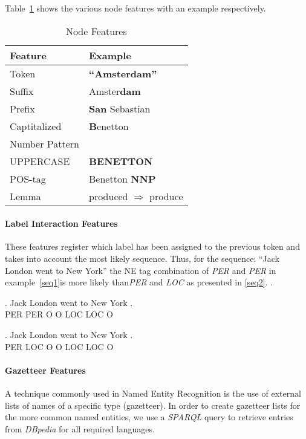 \documentclass[11pt]{article}
\begin{document}
Table~\ref{table:node} shows the various node features with an example respectively.

\begin{table}[h!]
\begin{tabular}{| l | l |}
\hline
\bf Feature & \bf Example \\
\hline
Token &  \textbf{``Amsterdam''}\\
Suffix& Amster\textbf{dam}\\
Prefix&  \textbf{San} Sebastian\\
Captitalized& \textbf{B}enetton\\
Number Pattern & \\
UPPERCASE &  \textbf{BENETTON}\\
POS-tag &  Benetton \textbf{NNP}   \\
Lemma &  produced $\Rightarrow$ produce \\
\hline
\end{tabular}
\caption{Node Features}
\label{table:node}
\end{table}

\paragraph*{Label Interaction Features}
These features register which label has been assigned to the previous token and takes into account the most likely sequence. 
Thus, for the sequence: ``Jack London went to New York'' the NE tag combination of \emph{PER} and \emph{PER} in example~\ref{seq1}is more likely 
than\emph{PER} and \emph{LOC} as presented in \ref{seq2}.
.

\exg. Jack London went to New York .\\
      PER   PER   O    O  LOC LOC  O \\\label{seq1}

\exg. Jack London went to New York . \\ 
      PER  LOC    O    O  LOC LOC O \\\label{seq2}
    

\paragraph*{Gazetteer Features}
A technique commonly used in Named Entity Recognition is the use of external lists of names of a specific type (gazetteer). In order to create gazetteer lists for the more common named entities, we use a \emph{SPARQL} query to retrieve entries from \emph{DBpedia} for all required languages.
\end{document}
